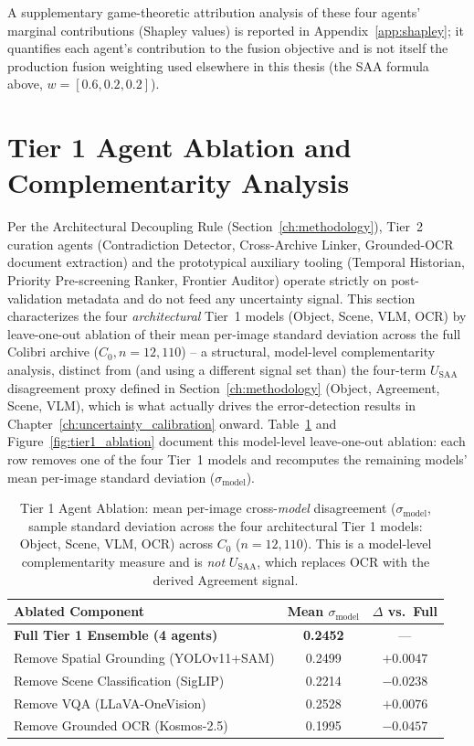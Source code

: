 \documentclass[12pt,a4paper]{report}
\begin{document}
A supplementary game-theoretic attribution analysis of these four agents' marginal contributions (Shapley values) is reported in Appendix~\ref{app:shapley}; it quantifies each agent's contribution to the fusion objective and is not itself the production fusion weighting used elsewhere in this thesis (the SAA formula above, $w=[0.6,0.2,0.2]$).

\section{Tier 1 Agent Ablation and Complementarity Analysis}
Per the Architectural Decoupling Rule (Section~\ref{ch:methodology}), Tier~2 curation agents (Contradiction Detector, Cross-Archive Linker, Grounded-OCR document extraction) and the prototypical auxiliary tooling (Temporal Historian, Priority Pre-screening Ranker, Frontier Auditor) operate strictly on post-validation metadata and do not feed any uncertainty signal. This section characterizes the four \emph{architectural} Tier~1 models (Object, Scene, VLM, OCR) by leave-one-out ablation of their mean per-image standard deviation across the full Colibri archive ($C_0, n=12,110$) -- a structural, model-level complementarity analysis, distinct from (and using a different signal set than) the four-term $U_{\text{SAA}}$ disagreement proxy defined in Section~\ref{ch:methodology} (Object, Agreement, Scene, VLM), which is what actually drives the error-detection results in Chapter~\ref{ch:uncertainty_calibration} onward. Table~\ref{tab:macro_ablation} and Figure~\ref{fig:tier1_ablation} document this model-level leave-one-out ablation: each row removes one of the four Tier~1 models and recomputes the remaining models' mean per-image standard deviation ($\sigma_{\text{model}}$).

\begin{table}[!htbp]
\centering
\caption[Tier 1 Agent Ablation]{Tier 1 Agent Ablation: mean per-image cross-\emph{model} disagreement ($\sigma_{\text{model}}$, sample standard deviation across the four architectural Tier 1 models: Object, Scene, VLM, OCR) across $C_0$ ($n=12{,}110$). This is a model-level complementarity measure and is \emph{not} $U_{\text{SAA}}$, which replaces OCR with the derived Agreement signal.}
\label{tab:macro_ablation}
\begin{tabular}{lcc}
\toprule
\textbf{Ablated Component} & \textbf{Mean $\sigma_{\text{model}}$} & \textbf{$\Delta$ vs.\ Full} \\
\midrule
\textbf{Full Tier 1 Ensemble (4 agents)} & \textbf{0.2452} & --- \\
\midrule
Remove Spatial Grounding (YOLOv11+SAM) & 0.2499 & $+0.0047$ \\
Remove Scene Classification (SigLIP) & 0.2214 & $-0.0238$ \\
Remove VQA (LLaVA-OneVision) & 0.2528 & $+0.0076$ \\
Remove Grounded OCR (Kosmos-2.5) & 0.1995 & $-0.0457$ \\
\bottomrule
\end{tabular}
\end{table}
\end{document}
